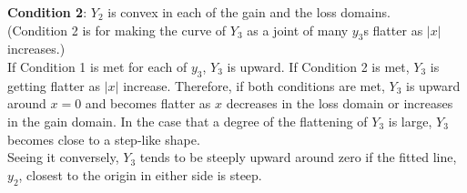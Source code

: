 \documentclass[11pt, a4paper]{article}
\begin{document}
\noindent
\textbf{Condition 2}: $Y_2$ is convex in each of the gain and the loss domains.\\
(Condition 2 is for making the curve of $Y_3$ as a joint of many $y_3$s flatter as $|x|$ increases.)\\

If Condition 1 is met for each of $y_3$, $Y_3$ is upward. If Condition 2 is met, $Y_3$ is getting flatter as $|x|$ increase. Therefore, if both conditions are met, $Y_3$ is upward around $x=0$ and becomes flatter as $x$ decreases in the loss domain or increases in the gain domain. In the case that a degree of the flattening of $Y_3$ is large, $Y_3$ becomes close to a step-like shape.\\






Seeing it conversely, $Y_3$ tends to be steeply upward around zero if the fitted line, $y_2$, closest to the origin in either side is steep.

\end{document}
